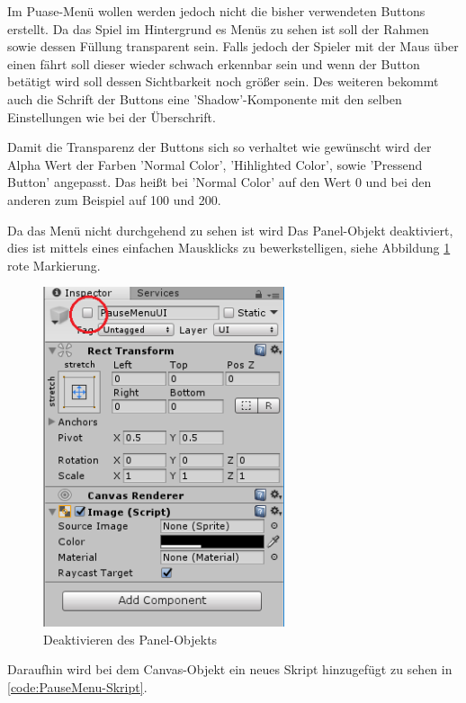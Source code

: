 Im Puase-Menü wollen werden jedoch nicht die bisher verwendeten Buttons erstellt. Da das Spiel im Hintergrund es Menüs zu sehen ist soll der Rahmen sowie dessen Füllung transparent sein. Falls jedoch der Spieler mit der Maus über einen fährt soll dieser wieder schwach erkennbar sein und wenn der Button betätigt wird soll dessen Sichtbarkeit noch größer sein. Des weiteren bekommt auch die Schrift der Buttons eine 'Shadow'-Komponente mit den selben Einstellungen wie bei der Überschrift. 

Damit die Transparenz der Buttons sich so verhaltet wie gewünscht wird der Alpha Wert der Farben 'Normal Color', 'Hihlighted Color', sowie 'Pressend Button' angepasst. Das heißt bei 'Normal Color' auf den Wert 0 und bei den anderen zum Beispiel auf 100 und 200. 

Da das Menü nicht durchgehend zu sehen ist wird Das Panel-Objekt deaktiviert, dies ist mittels eines einfachen Mausklicks zu bewerkstelligen, siehe Abbildung \ref{deactivatePanel} rote Markierung.
\begin{figure}[H]
	\includegraphics[height=10cm]{images/deactivatePanel.png}
	\caption{Deaktivieren des Panel-Objekts}
	\label{deactivatePanel}
\end{figure}

Daraufhin wird bei dem Canvas-Objekt ein neues Skript hinzugefügt zu sehen in \cref{code:PauseMenu-Skript}.

